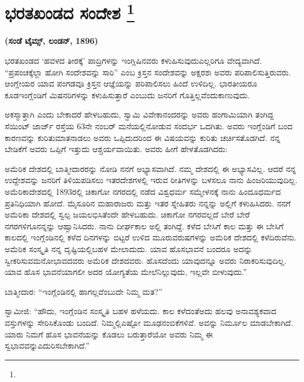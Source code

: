 
\chapter[ಭರತಖಂಡದ ಸಂದೇಶ ]{ಭರತಖಂಡದ ಸಂದೇಶ \protect\footnote{}}

\centerline{\textbf{(ಸಂಡೆ ಟೈಮ್ಸ್, ಲಂಡನ್​, 1896)}}

\vskip 0.4cm

ಭರತಖಂಡದ ‘ಹವಳದ ತೀರಕ್ಕೆ’ ಪಾದ್ರಿಗಳನ್ನು ಇಂಗ್ಲಿಷಿನವರು ಕಳುಹಿಸುವುದು\break ಎಲ್ಲರಿಗೂ ವೇದ್ಯವಾಗಿದೆ. “ಪ್ರಪಂಚಕ್ಕೆಲ್ಲಾ ಹೋಗಿ ಸಂದೇಶವನ್ನು ಸಾರಿ” ಎಂಬ ಕ್ರಿಸ್ತನ ಸಂದೇಶವನ್ನು ಅಕ್ಷರಶಃ ಅವರು ಪರಿಪಾಲಿಸುತ್ತಿರುವರು. ಆಂಗ್ಲೇಯರ ಯಾವ ಪಂಗ\-ಡವೂ ಕ್ರಿಸ್ತನ ಆಜ್ಞೆಯನ್ನು ಪರಿಪಾಲಿಸಲು ಹಿಂದೆ ಉಳಿದಿಲ್ಲ. ಭಾರತೀಯರೂ ಕೂಡ\break ಇಂಗ್ಲೆಂಡಿಗೆ ಮಿಷನರಿಗಳನ್ನು ಕಳುಹಿಸುತ್ತಾರೆ ಎಂಬುದು ಜನರಿಗೆ ಗೊತ್ತಿಲ್ಲವೆಂದು\break ಕಾಣುವುದು.

ಅಕಸ್ಮಾತ್ತಾಗಿ ಎಂದು ಬೇಕಾದರೆ ಹೇಳಬಹುದು, ಸ್ವಾಮಿ ವಿವೇಕಾನಂದರನ್ನು ಅವರು ಹಂಗಾಮಿಯಾಗಿ ತಂಗಿದ್ದ ಸೆಯಿಂಟ್​ ಜಾರ್ಜ್​ ರಸ್ತೆಯ 63ನೇ ನಂಬರ್​ ಮನೆಯಲ್ಲಿ\break ನೋಡುವ ಸಂದರ್ಭ ಒದಗಿತು. ಅವರು ಇಂಗ್ಲೆಂಡಿಗೆ ಬಂದ ಕಾರಣವನ್ನು ಕುರಿತು\break ಮಾತನಾಡಲು ಅವರು ಒಪ್ಪಿದುದರಿಂದ ಈ ವಿಷಯವನ್ನು ಕುರಿತು ಚರ್ಚಿಸತೊಡಗಿದೆ. ನನ್ನ ಬೇಡಿಕೆಗೆ ಅವರು ಒಪ್ಪಿಗೆ ಇತ್ತುದು ಆಶ್ಚರ್ಯವಾಯಿತು. ಅವರು ಹೀಗೆ ಹೇಳ\-ತೊಡಗಿದರು:

\vskip 0.1cm

ಅಮೆರಿಕ ದೇಶದಲ್ಲಿ ಬಾತ್ಮೀದಾರರನ್ನು ನೋಡಿ ನನಗೆ ಅಭ್ಯಾಸವಾಗಿದೆ. ನಮ್ಮ ದೇಶದಲ್ಲಿ ಈ ಅಭ್ಯಾಸವಿಲ್ಲ. ಆದರೆ ನನ್ನ ಉದ್ದೇಶವನ್ನು ಜನರಿಗೆ ತಿಳಿಯಪಡಿಸಲು ಇತರ\break ದೇಶಗಳಲ್ಲಿ ಇರುವ ರೀತಿಗಳನ್ನು ಬಳಸಲೂ ನಾನು ಹಿಂಜರಿಯುವುದಿಲ್ಲ. ಅಮೆರಿಕಾ\break ದೇಶದಲ್ಲಿ 1893ರಲ್ಲಿ ಚಿಕಾಗೋ ನಗರದಲ್ಲಿ ನಡೆದ ವಿಶ್ವಧರ್ಮ ಸಮ್ಮೇಳನಕ್ಕೆ ನಾನು ಹಿಂದೂಧರ್ಮದ ಪ್ರತಿನಿಧಿಯಾಗಿ ಹೋದೆ. ಮೈಸೂರಿನ ಮಹಾರಾಜರು ಮತ್ತು ಇತರ ಸ್ನೇಹಿತರು ನನ್ನನ್ನು ಅಲ್ಲಿಗೆ ಕಳುಹಿಸಿದರು. ನನಗೆ ಅಮೆರಿಕಾ ದೇಶದಲ್ಲಿ ಸ್ವಲ್ಪ ಜಯ\break ಲಭಿಸಿತೆಂದೇ ಹೇಳಬಹುದು. ಚಿಕಾಗೋ ನಗರವಲ್ಲದೆ ಬೇರೆ ಬೇರೆ ನಗರಗಳಿಗೂ\break ನನ್ನನ್ನು ಆಹ್ವಾನಿಸಿದರು. ನಾನು ದೀರ್ಘಕಾಲ ಅಲ್ಲಿ ತಂಗಿದ್ದೆ. ಕಳೆದ ಬೇಸಿಗೆ ಕಾಲ ಮತ್ತು ಈ ಬೇಸಿಗೆ ಕಾಲದಲ್ಲಿ ಇಂಗ್ಲೆಂಡಿನಲ್ಲಿ ಕಳೆದ ದಿನಗಳನ್ನು ಬಿಟ್ಟರೆ ಉಳಿದ ಮೂರು\break ವರುಷಗಳನ್ನು ಅಮೆರಿಕ ದೇಶದಲ್ಲಿ ಕಳೆದಿರುವೆನು. ಅಮೆರಿಕ ಸಂಸ್ಕೃತಿ ನನ್ನ ದೃಷ್ಟಿಯಲ್ಲಿ\break ಬಹಳ ಮೇಲಾದುದು. ಯಾವ ಹೊಸಭಾವನೆ ಬಂದರೂ ಅದನ್ನು ಸ್ವೀಕರಿಸುವ\break ಮನೋಭಾವದವರು ಅಮೆರಿಕ ದೇಶದವರು. ಹೊಸದೆಂದು ಯಾವುದನ್ನೂ ಅವರು ನಿರಾಕರಿಸುವುದಿಲ್ಲ. ಯಾವ ಹೊಸ ಭಾವನೆಯಾಗಲೀ ಅದರ ಯೋಗ್ಯತೆಯ ಮೇಲೆ\break ನಿಲ್ಲುವುದು, ಇಲ್ಲವೇ ಬೀಳುವುದು.”

\vskip 0.1cm

ಬಾತ್ಮೀದಾರ: “ಇಂಗ್ಲೆಂಡಿನಲ್ಲಿ ಹಾಗಲ್ಲವೆಂಬುದೇ ನಿಮ್ಮ ಮತ?”

\vskip 0.1cm

ಸ್ವಾಮೀಜಿ: “ಹೌದು, ಇಂಗ್ಲೆಂಡಿನ ಸಂಸ್ಕೃತಿ ಬಹಳ ಹಳೆಯದು. ಕಾಲ ಕಳೆದಂತೆ\break ಅದು ಹಲವು ಅನಾವಶ್ಯಕವಾದ ವಸ್ತುಗಳನ್ನು ಸೇರಿಸಿಕೊಂಡು ಬಂದಿದೆ. ನಿಮ್ಮಲ್ಲಿ\break ಎಷ್ಟೋ ಮೂಢನಂಬಿಕೆಗಳಿವೆ. ಅವನ್ನು ನಿರ್ಮೂಲ ಮಾಡಬೇಕಾಗಿದೆ. ಯಾರು ನಿಮಗೆ ಹೊಸ ಭಾವನೆಯನ್ನು ಕೊಡಲು ಬರುತ್ತಾರೆಯೋ ಅವರು ನಿಮ್ಮ ಈ ಸ್ವಭಾವವನ್ನು\break ಎದುರಿಸಬೇಕಾಗಿದೆ.”

